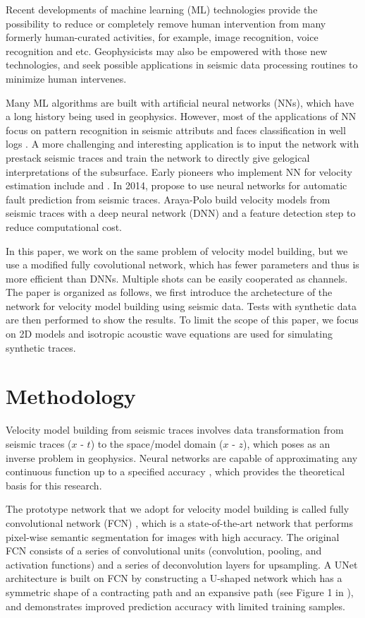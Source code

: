 \documentclass{segabs}
\begin{document}
Recent developments of machine learning (ML) technologies provide the possibility to reduce or completely remove human intervention from many formerly human-curated activities, for example, image recognition, voice recognition and etc. Geophysicists may also be empowered with those new technologies, and seek possible applications in seismic data processing routines to minimize human intervenes.

Many ML algorithms are built with artificial neural networks (NNs), which have a long history being used in geophysics. However, most of the applications of NN focus on pattern recognition in seismic attributs  \citep{zeng04,zhao15} and faces classification in well logs \citep{lim05,hall16}. A more challenging and interesting application is to input the network with prestack seismic traces and train the network to directly give gelogical interpretations of the subsurface. Early pioneers who implement NN for velocity estimation include \citet{roth94} and \citet{nath99}.
In 2014, \citet{zhang14} propose to use neural networks for automatic fault prediction from seismic traces. Araya-Polo \citet{araya18} build velocity models from seismic traces with a deep neural network (DNN) and a feature detection step to reduce computational cost. 

In this paper, we work on the same problem of velocity model building, but we use a modified fully covolutional network, which has fewer parameters and thus is more efficient than DNNs. Multiple shots can be easily cooperated as channels. 
The paper is organized as follows, we first introduce the archetecture of the network for velocity model building using seismic data. Tests with synthetic data are then performed to show the results. To limit the scope of this paper, we focus on 2D models and isotropic acoustic wave equations are used for simulating synthetic traces.


\section{Methodology}

Velocity model building from seismic traces involves data transformation from seismic traces ($x$ - $t$) to the space/model domain ($x$ - $z$), which poses as an inverse problem in geophysics. Neural networks are capable of approximating any continuous function up to a specified accuracy \citep{hornik89}, which provides the theoretical basis for this research.

The prototype network that we adopt for velocity model building is called fully convolutional network (FCN) \citep{long15}, which is a state-of-the-art network that performs pixel-wise semantic segmentation for images with high accuracy. The original FCN consists of a series of convolutional units (convolution, pooling, and activation functions) and a series of deconvolution layers for upsampling. A UNet architecture \citep{ronneberger15} is built on FCN by constructing a U-shaped network which has a symmetric shape of a contracting path and an expansive path (see Figure 1 in \citet{ronneberger15}), and demonstrates improved prediction accuracy with limited training samples. 
\end{document}
